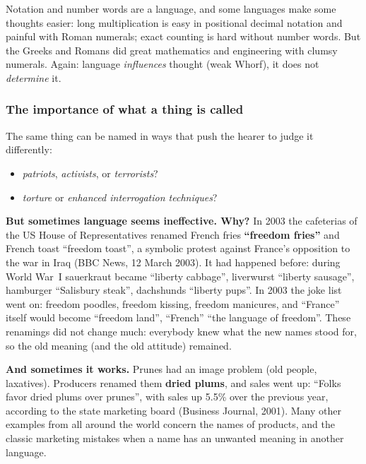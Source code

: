 \begin{nbintuition}
Notation and number words are a language, and some languages make some thoughts easier:
long multiplication is easy in positional decimal notation and painful with Roman
numerals; exact counting is hard without number words. But the Greeks and Romans did
great mathematics and engineering with clumsy numerals. Again: language \emph{influences}
thought (weak Whorf), it does not \emph{determine} it.
\end{nbintuition}

\subsubsection{The importance of what a thing is called}

The same thing can be named in ways that push the hearer to judge it differently:
\begin{itemize}[nosep]
  \item \emph{patriots}, \emph{activists}, or \emph{terrorists}?
  \item \emph{torture} or \emph{enhanced interrogation techniques}?
\end{itemize}

\textbf{But sometimes language seems ineffective. Why?} In 2003 the cafeterias of the US
House of Representatives renamed French fries \textbf{``freedom fries''} and French toast
``freedom toast'', a symbolic protest against France's opposition to the war in Iraq
(BBC News, 12 March 2003). It had happened before: during World War~I sauerkraut became
``liberty cabbage'', liverwurst ``liberty sausage'', hamburger ``Salisbury steak'',
dachshunds ``liberty pups''. In 2003 the joke list went on: freedom poodles, freedom
kissing, freedom manicures, and ``France'' itself would become ``freedom land'', ``French''
``the language of freedom''. These renamings did not change much: everybody knew what
the new names stood for, so the old meaning (and the old attitude) remained.

\textbf{And sometimes it works.} Prunes had an image problem (old people, laxatives).
Producers renamed them \textbf{dried plums}, and sales went up: ``Folks favor dried plums
over prunes'', with sales up 5.5\% over the previous year, according to the state
marketing board (Business Journal, 2001). Many other examples from all around the world
concern the names of products, and the classic marketing mistakes when a name has an
unwanted meaning in another language.

